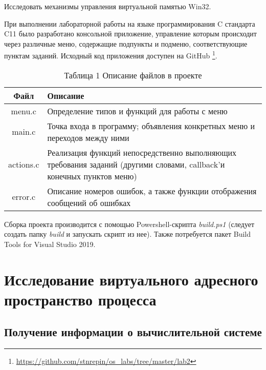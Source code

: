 \documentclass[a4paper,14pt]{extarticle}
\newcommand{\Code}[1]{\textit{#1}}
\begin{document}


\renewcommand*{\thepage}{}
\tableofcontents
\clearpage
\renewcommand*{\thepage}{\arabic{page}}

\setcounter{page}{3}


Исследовать механизмы управления виртуальной памятью Win32.


При выполнении лабораторной работы на языке программирования C стандарта C11
было разработано консольной приложение, управление которым происходит через
различные меню, содержащие подпункты и подменю, соответствующие пунктам
заданий. Исходный код приложения доступен на GitHub
\footnote{\url{https://github.com/stnrepin/os_labs/tree/master/lab2}}.

\begin{table}[H]
    \centering
    \begin{tabularx}{\textwidth}{|c|X|}
        \hline
        Файл & Описание \\
        \hline
        menu.c & Определение типов и функций для работы с меню \\
        \hline
        main.c & Точка входа в программу; объявления конкретных меню и
                    переходов между ними \\
        \hline
        actions.c & Реализация функций непосредственно выполняющих требования
                    заданий (другими словами, callback'и конечных пунктов меню)
                    \\
        \hline
        error.c & Описание номеров ошибок, а также функции отображения
                    сообщений об ошибках \\
        \hline
    \end{tabularx}
    \caption*{Таблица 1 Описание файлов в проекте}
\end{table}

Сборка проекта производится с помощью Powershell-скрипта \Code{build.ps1}
(следует создать папку \Code{build} и запускать скрипт из нее). Также
потребуется пакет Build Tools for Visual Studio 2019.


\clearpage

\section{Исследование виртуального адресного пространство процесса}


\subsection{Получение информации о вычислительной системе}
\end{document}
